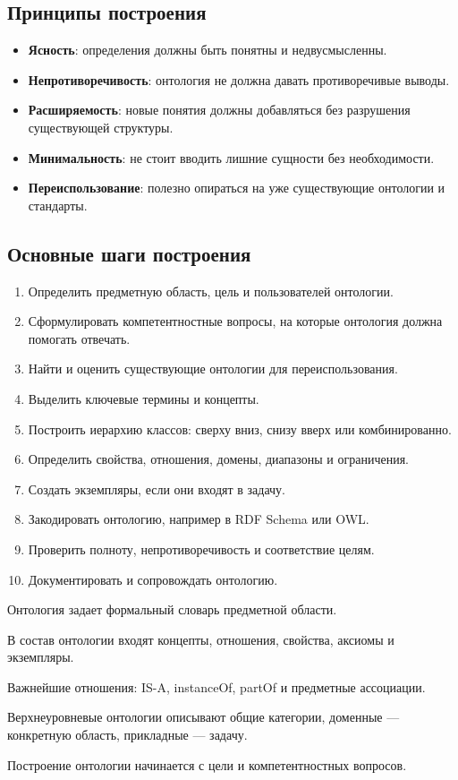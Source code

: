 \subsection*{Принципы построения}

\begin{itemize}
    \item \textbf{Ясность}: определения должны быть понятны и недвусмысленны.
    \item \textbf{Непротиворечивость}: онтология не должна давать противоречивые выводы.
    \item \textbf{Расширяемость}: новые понятия должны добавляться без разрушения существующей структуры.
    \item \textbf{Минимальность}: не стоит вводить лишние сущности без необходимости.
    \item \textbf{Переиспользование}: полезно опираться на уже существующие онтологии и стандарты.
\end{itemize}

\subsection*{Основные шаги построения}

\begin{enumerate}
    \item Определить предметную область, цель и пользователей онтологии.
    \item Сформулировать компетентностные вопросы, на которые онтология должна помогать отвечать.
    \item Найти и оценить существующие онтологии для переиспользования.
    \item Выделить ключевые термины и концепты.
    \item Построить иерархию классов: сверху вниз, снизу вверх или комбинированно.
    \item Определить свойства, отношения, домены, диапазоны и ограничения.
    \item Создать экземпляры, если они входят в задачу.
    \item Закодировать онтологию, например в RDF Schema или OWL.
    \item Проверить полноту, непротиворечивость и соответствие целям.
    \item Документировать и сопровождать онтологию.
\end{enumerate}

\begin{important}
    \item Онтология задает формальный словарь предметной области.
    \item В состав онтологии входят концепты, отношения, свойства, аксиомы и экземпляры.
    \item Важнейшие отношения: IS-A, instanceOf, partOf и предметные ассоциации.
    \item Верхнеуровневые онтологии описывают общие категории, доменные --- конкретную область, прикладные --- задачу.
    \item Построение онтологии начинается с цели и компетентностных вопросов.
\end{important}
